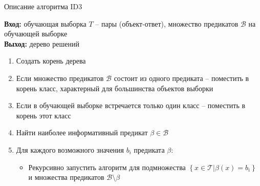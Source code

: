 \documentclass[compress,red,unicode]{beamer}
\begin{document}
\begin{frame}{Описание алгоритма ID3}{}
\begin{block}{}
\small
{\bf\color{main}Вход:} обучающая выборка $T$ -- пары (объект-ответ), множество предикатов $\mathcal{B}$ на обучающей выборке\\
{\bf\color{main}Выход:} дерево решений \\
\begin{enumerate}
\item Создать корень дерева
\item Если множество предикатов $\mathcal{B}$ состоит из одного предиката -- поместить в корень класс, характерный для большинства объектов выборки
\item Если в обучающей выборке встречается только один класс -- поместить в корень этот класс
\item Найти наиболее информативный предикат $\beta \in \mathcal{B}$
\item Для каждого возможного значения $b_i$ предиката $\beta$:
\begin{itemize}
	\item Рекурсивно запустить алгоритм для подмножества $\left\{x\in \mathcal{T}| \beta(x)=b_i \right\}$ и множества предикатов $\mathcal{B} \setminus \beta$

\end{itemize}

\end{enumerate}
\end{block}
\end{frame}

\begin{frame}{}
\begin{block}{}
\scriptsize

\end{block}
\end{frame}


\begin{frame}{}
\begin{block}{}
\scriptsize

\end{block}
\end{frame}
\end{document}
